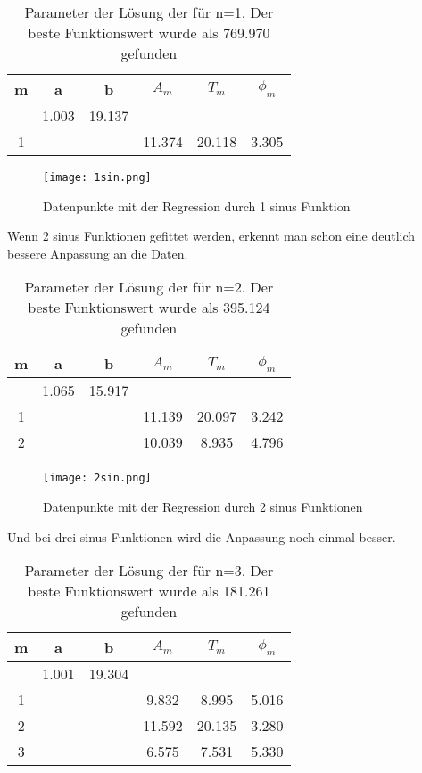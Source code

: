 \documentclass[12pt]{article}
\begin{document}
\begin{table}[H]\centering\begin{tabular}{|c|c|c|c|c|c|}\hline
    m&a&b&$A_m$&$T_m$&$\phi_m$\\\hline\hline
    &1.003&19.137&&&\\
1&&&11.374&20.118&3.305\\
\hline
\end{tabular}\caption{Parameter der Lösung der für n=1. Der beste Funktionswert wurde als 769.970 gefunden}\end{table}

\begin{figure}[H]\centering\texttt{[image: 1sin.png]}\caption{Datenpunkte mit der Regression durch 1 sinus Funktion}\end{figure}\newpage
Wenn 2 sinus Funktionen gefittet werden, erkennt man schon eine deutlich bessere Anpassung an die Daten.
\begin{table}[H]\centering\begin{tabular}{|c|c|c|c|c|c|}\hline
    m&a&b&$A_m$&$T_m$&$\phi_m$\\\hline\hline
    &1.065&15.917&&&\\
1&&&11.139&20.097&3.242\\
2&&&10.039&8.935&4.796\\
\hline
\end{tabular}\caption{Parameter der Lösung der für n=2. Der beste Funktionswert wurde als 395.124 gefunden}\end{table}
\begin{figure}[H]\centering\texttt{[image: 2sin.png]}\caption{Datenpunkte mit der Regression durch 2 sinus Funktionen}\end{figure}
Und bei drei sinus Funktionen wird die Anpassung noch einmal besser.
\begin{table}[H]\centering\begin{tabular}{|c|c|c|c|c|c|}\hline
    m&a&b&$A_m$&$T_m$&$\phi_m$\\\hline\hline
    &1.001&19.304&&&\\
    1&&&9.832&8.995&5.016\\
    2&&&11.592&20.135&3.280\\
    3&&&6.575&7.531&5.330\\
\hline
\end{tabular}\caption{Parameter der Lösung der für n=3. Der beste Funktionswert wurde als 181.261 gefunden}\end{table}
\end{document}
